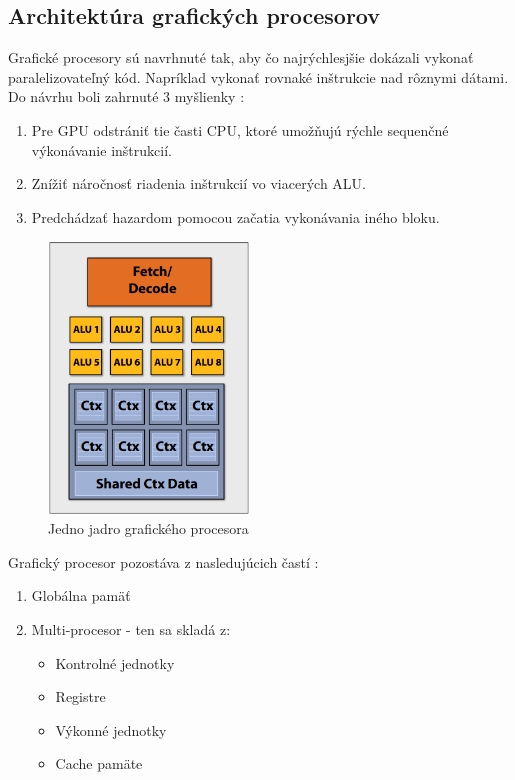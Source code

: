 \documentclass[conference]{IEEEtran}
\begin{document}
\subsection{Architektúra grafických procesorov}

Grafické procesory sú navrhnuté tak, aby čo najrýchlesjšie dokázali vykonať paralelizovateľný kód. Napríklad vykonať rovnaké inštrukcie nad rôznymi dátami. Do návrhu boli zahrnuté 3 myšlienky \cite{GPU2011Fatahalian}: 

\begin{enumerate}
	\item{Pre GPU odstrániť tie časti CPU, ktoré umožňujú rýchle sequenčné výkonávanie inštrukcií.}\\
	\item{Znížiť náročnosť riadenia inštrukcií vo viacerých ALU.}\\
	\item{Predchádzať hazardom pomocou začatia vykonávania iného bloku.}
\end{enumerate}

\begin{figure}[!h]
\centering
\includegraphics[width=2.1in]{img/GPU-core}
\caption{Jedno jadro grafického procesora \label{core}}
\end{figure}

Grafický procesor pozostáva z nasledujúcich častí \cite{tatourian}:

\begin{enumerate}
	\item{Globálna pamäť}
	\item{Multi-procesor - ten sa skladá z:}
	\begin{itemize}
		\item{Kontrolné jednotky}
		\item{Registre}
		\item{Výkonné jednotky}
		\item{Cache pamäte}
	\end{itemize}
\end{enumerate}
\end{document}
